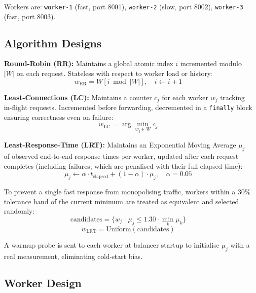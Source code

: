 \documentclass[conference]{IEEEtran}
\begin{document}
Workers are: \texttt{worker-1} (fast, port 8001), \texttt{worker-2} (slow, port 8002), \texttt{worker-3} (fast, port 8003).

\subsection{Algorithm Designs}

\textbf{Round-Robin (RR):} Maintains a global atomic index $i$ incremented modulo $|W|$ on each request. Stateless with respect to worker load or history:
\begin{equation}
  w_{\text{RR}} = W[i \bmod |W|], \quad i \leftarrow i + 1
\end{equation}

\textbf{Least-Connections (LC):} Maintains a counter $c_j$ for each worker $w_j$ tracking in-flight requests. Incremented before forwarding, decremented in a \texttt{finally} block ensuring correctness even on failure:
\begin{equation}
  w_{\text{LC}} = \arg\min_{w_j \in W} c_j
\end{equation}

\textbf{Least-Response-Time (LRT):} Maintains an Exponential Moving Average $\mu_j$ of observed end-to-end response times per worker, updated after each request completes (including failures, which are penalised with their full elapsed time):
\begin{equation}
  \mu_j \leftarrow \alpha \cdot t_{\text{elapsed}} + (1 - \alpha) \cdot \mu_j, \quad \alpha = 0.05
\end{equation}

To prevent a single fast response from monopolising traffic, workers within a 30\% tolerance band of the current minimum are treated as equivalent and selected randomly:
\begin{equation}
  \text{candidates} = \{w_j \mid \mu_j \leq 1.30 \cdot \min_k \mu_k\}
\end{equation}
\begin{equation}
  w_{\text{LRT}} = \text{Uniform}(\text{candidates})
\end{equation}

A warmup probe is sent to each worker at balancer startup to initialise $\mu_j$ with a real measurement, eliminating cold-start bias.

\subsection{Worker Design}
\end{document}
